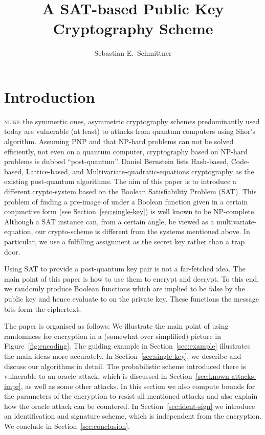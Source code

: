\documentclass[final,journal,compsoc]{IEEEtran}
\title{A SAT-based Public Key Cryptography Scheme}
\author{Sebastian  E.~Schmittner\IEEEcompsocitemizethanks{\IEEEcompsocthanksitem
  Universit\"at zu K\"oln\par
  Institut f\"ur Theoretische Physik\par
  Z\"ulpicher Stra\ss{}e~77;
  D-50937~K\"oln\par
 \href{mailto:ses@thp.uni-koeln.de}{ses@thp.uni-koeln.de}
  }}
\begin{document}
\maketitle


\section{Introduction\label{sec:introduction}}
\textsc{nlike} the symmertic ones,
asymmetric cryptography schemes
predominantly used today are vulnerable (at least) to attacks from
quantum computers using Shor's algorithm. Assuming PNP and that NP-hard problems can not be
solved efficiently, not even on a quantum computer, cryptography based
on NP-hard problems is dubbed ``post-quantum''.
 Daniel Bernstein
\cite{BBD09} lists Hash-based, Code-based,
Lattice-based, and Multivariate-quadratic-equations
cryptography as the existing post-quantum algorithms.  
The aim of this
paper is to introduce a different crypto-system based on
the Boolean Satisfiability Problem (SAT). This problem of finding a
pre-image of  under a Boolean function given in a certain
conjunctive form (see Section~\ref{sec:single-key}) is well known to be NP-complete. Although a SAT
instance can, from a certain angle, be viewed as a
multivariate-equation, our crypto-scheme is different from the
systems mentioned above. In particular, we use a fulfilling assignment
as the secret key rather than a trap door. 

Using SAT to provide a post-quantum key pair is not a
far-fetched idea. The main point of this paper is how to use them to
encrypt and decrypt. To this end, we randomly produce
Boolean functions which are implied to be false by the public key and hence
evaluate to  on the private key. These functions  the
message bits form the ciphertext.

The paper is organised as follows: We illustrate the main point of
using randomness for encryption in a (somewhat over simplified)
picture in Figure~\ref{fig:encoding}.  The guiding example in
Section~\ref{sec:example} illustrates the main ideas more accurately.
In Section~\ref{sec:single-key}, we describe and discuss our
algorithms in detail. The probabilistic scheme introduced there is
vulnerable to an oracle attack, which is discussed in
Section~\ref{sec:known-attacks-impr}, as well as some other
attacks. In this section we also compute bounds for the parameters of
the encryption to resist all mentioned attacks and also explain how
the oracle attack can be countered.  In Section~\ref{sec:ident-sign}
we introduce an identification and signature scheme, which is
independent from the encryption.  We conclude in
Section~\ref{sec:conclusion}.
\end{document}
